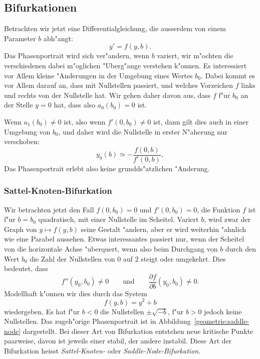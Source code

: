 \subsection{Bifurkationen\label{geometrie:subsection:bifurkationen}}
%
Betrachten wir jetzt eine Differentialgleichung, die ausserdem von einem
Parameter $b$ abh"angt:
\[
y'=f(y,b).
\]
Das Phasenportrait wird sich ver"andern, wenn $b$ variert, wir
m"ochten die verschiedenen dabei m"oglichen "Uberg"ange verstehen
k"onnen.
Es interessiert vor Allem kleine "Anderungen in der Umgebung eines
Wertes $b_0$.
Dabei kommt es vor Allem darauf an, dass mit Nullstellen passiert, und
welches Vorzeichen $f$ links und rechts von der Nullstelle hat.
Wir gehen daher davon aus, dass $f$ f"ur $b_0$ an der Stelle $y=0$
hat, dass also $a_0(b_0)=0$ ist.

Wenn $a_1(b_0)\ne0$ ist, also wenn $f'(0, b_0)\ne 0$ ist, dann 
gilt dies auch in einer Umgebung von $b_0$, und daher wird die
Nullstelle in erster N"aherung nur verschoben:
\[
y_0(b) \simeq -\frac{f(0,b)}{f'(0,b)},
\]
Das Phasenportrait erlebt also keine grundds"atzlichen "Anderung.

\subsubsection{Sattel-Knoten-Bifurkation}
Wir betrachten jetzt den Fall $f(0,b_0)=0$ und $f'(0,b_0)=0$, die Funktion
$f$ ist f"ur $b=b_0$ quadratisch, mit einer Nullstelle im Scheitel.
Variert $b$, wird zwar der Graph von $y\mapsto f(y,b)$ seine
Gestalt "andern, aber er wird weiterhin "ahnlich wie eine Parabel
aussehen.
Etwas interessantes passiert nur, wenn der Scheitel von die horizontale
Achse "uberquert, wenn also beim Durchgang von $b$ durch den Wert $b_0$
die Zahl der Nullstellen von $0$ auf $2$ steigt oder umgekehrt.
Dies bedeutet, dass 
\[
f''(y_0,b_0)\ne 0
\qquad
\text{und}
\qquad
\frac{\partial f}{\partial b}(y_0, b_0)\ne 0.
\]
Modellhaft k"onnen wir dies durch das System
\[
f(y,b)=y^2+b
\]
wiedergeben.
Es hat f"ur $b<0$ die Nullstellen $\pm\sqrt{-b}$, f"ur $b>0$ jedoch
keine Nullstellen.
Das zugeh"orige Phasenportrait ist in Abbildung~\ref{geometrie:saddle-node}
dargestellt.
Bei dieser Art von Bifurkation entstehen neue kritische Punkte
paarweise, davon ist jeweils einer stabil, der andere instabil.
Diese Art der Bifurkation heisst {\em Sattel-Knoten-}
oder {\em Saddle-Node-Bifurkation}.
%
%

